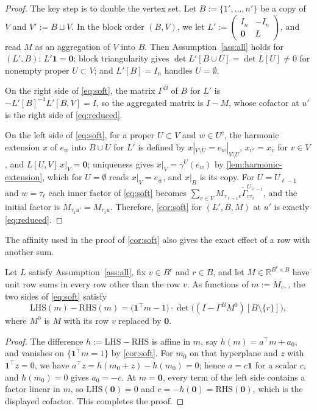 \documentclass[onefignum,onetabnum,nohypdvips]{siamart250211}
\numberwithin{theorem}{section}
\numberwithin{equation}{section}
\newcommand{\R}{\mathbb{R}}
\newcommand{\one}{\mathbf{1}}
\newcommand{\zero}{\mathbf{0}}
\begin{document}
\begin{proof}
The key step is to double the vertex set. Let $B:=\{1',\dots,n'\}$ be a
copy of $V$ and $V':=B\sqcup V$. In the block order $(B,V)$, we let
$L':=\left(\begin{smallmatrix}I_n&-I_n\\ \zero&L\end{smallmatrix}\right)$,
and read $M$ as an aggregation of $V$ into $B$. Then Assumption~\ref{ass:all}
holds for $(L',B)$: $L'\one=\zero$; block triangularity gives
$\det L'[B\cup U]=\det L[U]\ne0$ for nonempty proper $U\subset V$; and
$L'[B]=I_n$ handles $U=\emptyset$. 

On the right side of \eqref{eq:soft},
the matrix $\Gamma^B$ of $B$ for $L'$ is $-L'[B]^{-1}L'[B,V]=I$, so the
aggregated matrix is $I-M$, whose cofactor at $u'$ is the right side of
\eqref{eq:reduced}. 

On the left side of \eqref{eq:soft}, for a proper $U\subset V$
and $w\in U^c$, the harmonic extension $x$ of $e_w$ into $B\cup U$ for
$L'$ is defined by $x|_{V\setminus U}=e_w|_{V\setminus U}$,
$x_{v'}=x_v$ for $v\in V$, and $L[U,V]\,x|_V=\zero$; uniqueness gives
$x|_V=\gamma^{U}(e_w)$ by \cref{lem:harmonic-extension}, which for
$U=\emptyset$ reads $x|_V=e_w$, and $x|_B$ is its copy. For $U=U_{\ell-1}$ and
$w=\tau_\ell$ each inner factor of \eqref{eq:soft} becomes
$\sum_{v\in V}M_{\tau_{\ell+1}v}\tilde\Gamma^{U_{\ell-1}}_{v\tau_\ell}$, and the
initial factor is $M_{\tau_1u'}=M_{\tau_1u}$. Therefore, \cref{cor:soft}
for $(L',B,M)$ at $u'$ is exactly \eqref{eq:reduced}.
\end{proof}

The affinity used in the proof of \cref{cor:soft} also gives the exact
effect of a row with another sum.

\begin{proposition}\label{prop:rowsum}
Let $L$ satisfy Assumption~\ref{ass:all}, fix $v\in B^c$ and $r\in B$, and let
$M\in\R^{B^c\times B}$ have unit row sums in every row other than the row
$v$. As functions of $m:=M_{v\cdot}$, the two sides of \eqref{eq:soft}
satisfy
\[
\mathrm{LHS}(m)-\mathrm{RHS}(m)=\big(\one^{\top}m-1\big)\cdot
\det\big((I-\Gamma^BM^{0})[B\setminus\{r\}]\big),
\]
where $M^{0}$ is $M$ with its row $v$ replaced by $\zero$.
\end{proposition}

\begin{proof}
The difference $h:=\mathrm{LHS}-\mathrm{RHS}$ is affine in $m$, say
$h(m)=a^{\top}m+a_0$, and vanishes on $\{\one^{\top}m=1\}$ by
\cref{cor:soft}. For $m_0$ on that hyperplane and $z$ with
$\one^{\top}z=0$, we have $a^{\top}z=h(m_0+z)-h(m_0)=0$; hence $a=c\one$
for a scalar $c$, and $h(m_0)=0$ gives $a_0=-c$. At $m=\zero$, every
term of the left side contains a factor linear in $m$, so
$\mathrm{LHS}(\zero)=0$ and $c=-h(\zero)=\mathrm{RHS}(\zero)$, which is
the displayed cofactor. This completes the proof.
\end{proof}
\end{document}
